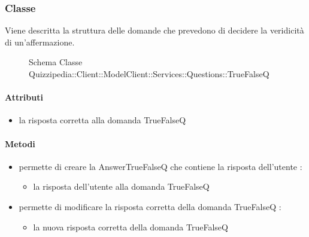 \subsubsection{Classe }
Viene descritta la struttura delle domande che prevedono di decidere la veridicità di un'affermazione.
\begin{figure}[H]
\centering
\noindent{}
\caption[Schema Classe TrueFalseQ]{Schema Classe Quizzipedia::Client::ModelClient::Services::Questions::TrueFalseQ}
\end{figure}
\paragraph{Attributi}
\begin{itemize}
\item {}
\newline
la risposta corretta alla domanda TrueFalseQ
\end{itemize}
\paragraph{Metodi}
\begin{itemize}
\item {}
\newline
permette di creare la AnswerTrueFalseQ che contiene la risposta dell'utente
\newline
{} :
\begin{itemize}
\item {}
\newline
la risposta dell'utente alla domanda TrueFalseQ
\end{itemize}
\item {}
\newline
permette di modificare la risposta corretta della domanda TrueFalseQ
\newline
{} :
\begin{itemize}
\item {}
\newline
la nuova risposta corretta della domanda TrueFalseQ
\end{itemize}
\end{itemize}
